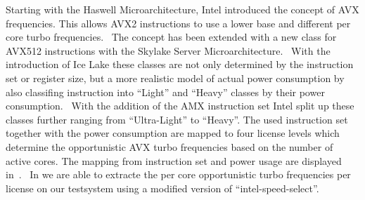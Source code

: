 Starting with the Haswell Microarchitecture, Intel introduced the concept of AVX frequencies.
This allows AVX2 instructions to use a lower base and different per core turbo frequencies.~\cite{Hackenberg_2015_Haswell}
The concept has been extended with a new class for AVX512 instructions with the Skylake Server Microarchitecture.~\cite[Sec. 2.6.3]{Intel_Optimization_Reference_Manual_050}
With the introduction of Ice Lake these classes are not only determined by the instruction set or register size, but a more realistic model of actual power consumption by also classifing instruction into ``Light'' and ``Heavy'' classes by their power consumption.~\cite{papazian_new_2020}
With the addition of the AMX instruction set Intel split up these classes further ranging from ``Ultra-Light'' to ``Heavy''.
The used instruction set together with the power consumption are mapped to four license levels which determine the opportunistic AVX turbo frequencies based on the number of active cores.
The mapping from instruction set and power usage are displayed in~.~\cite{ServeTheHome_Emerald_Rapids_2023}
In  we are able to extracte the per core opportunistic turbo frequencies per license on our testsystem using a modified version of ``intel-speed-select''.


